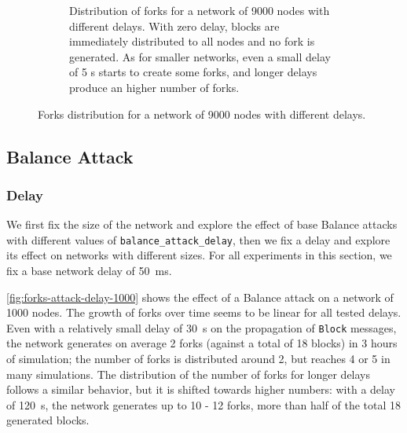 \begin{figure}[h]
\begin{subfigure}{\textwidth}
		\vspace*{0.25cm}
		\caption{
			Distribution of forks for a network of \num{9000} nodes with different delays.
			With zero delay, blocks are immediately distributed to all nodes and no fork is generated.
			As for smaller networks, even a small delay of \num{5} s starts to create some forks, and longer delays produce an higher number of forks.
		}
		\vspace*{0.25cm}
	\end{subfigure}
	\caption[Forks distribution for a network of 9000 nodes with different delays]{
		Forks distribution for a network of \num{9000} nodes with different delays.
	}
	\label{fig:forks-delay-9000}
\end{figure}

\subsection{Balance Attack}

\subsubsection{Delay}
We first fix the size of the network and explore the effect of base Balance attacks with different values of \texttt{balance\_attack\_delay}, then we fix a delay and explore its effect on networks with different sizes.
For all experiments in this section, we fix a base network delay of \SI{50}{\milli\second}.

\medskip
\cref{fig:forks-attack-delay-1000} shows the effect of a Balance attack on a network of \num{1000} nodes.
The growth of forks over time seems to be linear for all tested delays.
Even with a relatively small delay of \SI{30}{\second} on the propagation of \texttt{Block} messages, the network generates on average \num{2} forks (against a total of \num{18} blocks) in \num{3} hours of simulation;
the number of forks is distributed around \num{2}, but reaches \num{4} or \num{5} in many simulations.
The distribution of the number of forks for longer delays follows a similar behavior, but it is shifted towards higher numbers:
with a delay of \SI{120}{\second}, the network generates up to \num{10} - \num{12} forks, more than half of the total \num{18} generated blocks.

